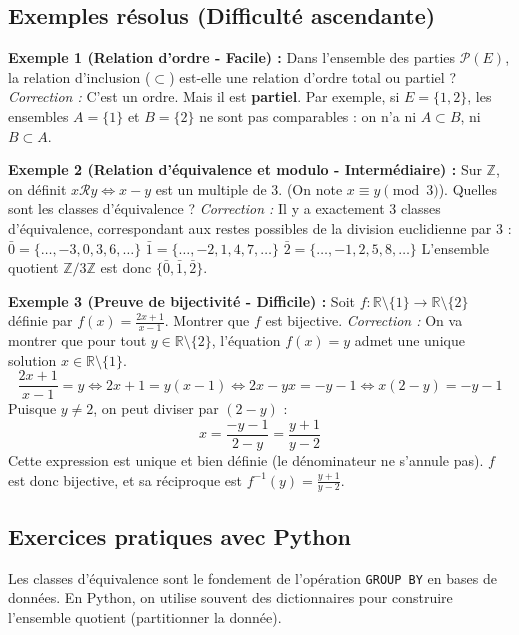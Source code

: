 \subsection{Exemples résolus (Difficulté ascendante)}

\textbf{Exemple 1 (Relation d'ordre - Facile) :} 
Dans l'ensemble des parties $\mathcal{P}(E)$, la relation d'inclusion ($\subset$) est-elle une relation d'ordre total ou partiel ?
\textit{Correction :} C'est un ordre. Mais il est \textbf{partiel}. Par exemple, si $E = \{1, 2\}$, les ensembles $A = \{1\}$ et $B = \{2\}$ ne sont pas comparables : on n'a ni $A \subset B$, ni $B \subset A$.

\textbf{Exemple 2 (Relation d'équivalence et modulo - Intermédiaire) :}
Sur $\mathbb{Z}$, on définit $x \mathcal{R} y \iff x - y$ est un multiple de 3. (On note $x \equiv y \pmod 3$).
Quelles sont les classes d'équivalence ?
\textit{Correction :} Il y a exactement 3 classes d'équivalence, correspondant aux restes possibles de la division euclidienne par 3 :
$\bar{0} = \{\dots, -3, 0, 3, 6, \dots\}$
$\bar{1} = \{\dots, -2, 1, 4, 7, \dots\}$
$\bar{2} = \{\dots, -1, 2, 5, 8, \dots\}$
L'ensemble quotient $\mathbb{Z}/3\mathbb{Z}$ est donc $\{\bar{0}, \bar{1}, \bar{2}\}$.

\textbf{Exemple 3 (Preuve de bijectivité - Difficile) :}
Soit $f : \mathbb{R} \setminus \{1\} \to \mathbb{R} \setminus \{2\}$ définie par $f(x) = \frac{2x+1}{x-1}$. Montrer que $f$ est bijective.
\textit{Correction :} On va montrer que pour tout $y \in \mathbb{R} \setminus \{2\}$, l'équation $f(x) = y$ admet une unique solution $x \in \mathbb{R} \setminus \{1\}$.
$$ \frac{2x+1}{x-1} = y \iff 2x+1 = y(x-1) \iff 2x - yx = -y - 1 \iff x(2-y) = -y-1 $$
Puisque $y \neq 2$, on peut diviser par $(2-y)$ :
$$ x = \frac{-y-1}{2-y} = \frac{y+1}{y-2} $$
Cette expression est unique et bien définie (le dénominateur ne s'annule pas). $f$ est donc bijective, et sa réciproque est $f^{-1}(y) = \frac{y+1}{y-2}$.

\subsection{Exercices pratiques avec Python}
Les classes d'équivalence sont le fondement de l'opération \texttt{GROUP BY} en bases de données. En Python, on utilise souvent des dictionnaires pour construire l'ensemble quotient (partitionner la donnée).


